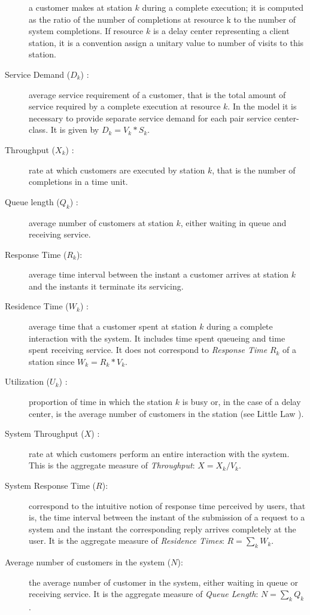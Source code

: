 \begin{description}
a customer makes at station $k$ during a complete execution; it is
computed as the ratio of the number of completions at resource k to
the number of system completions. If resource $k$ is a delay center
representing a client station, it is a convention assign a unitary
value to number of visits to this station.
\item[Service Demand ($D_k$) :] average service requirement of
a customer, that is the total amount of service required  by a
complete execution at resource $k$. In the model it is necessary to
provide separate service demand for each pair service center-class.
It is given by $D_k = V_k * S_k$.
\item[Throughput ($X_k$) :] rate at which customers are executed
by station $k$, that is the number of completions in a time unit.
\item[Queue length ($Q_k$) :] average number of customers at station
$k$, either waiting in queue and receiving service.
\item[Response Time ($R_k$):] average time interval between the instant
a customer arrives at station $k$ and the instants it terminate its
servicing.
\item[Residence Time ($W_k$) :] average
time that a customer spent at station $k$ during a complete
interaction with the system. It includes time spent queueing and
time spent receiving service. It does not correspond to
\emph{Response Time} $R_k$ of a station since $W_k = R_k * V_k$.
\item[Utilization ($U_k$) :] proportion of time in which the station $k$ is busy or, in the case
of a delay center, is the average  number of  customers in the
station (see Little Law \cite{Little}).
\item[System Throughput ($X$) :] rate at which customers perform
an entire interaction with the system. This is the aggregate measure
of \emph{Throughput}: $X = X_k / V_k$.
\item[System Response Time ($R$):] correspond to the intuitive
notion of response time perceived by users, that is, the time
interval between the instant of the submission of a request to a
system and the instant the corresponding reply arrives completely at
the user. It is the aggregate measure of \emph{Residence Times}: $R
= \sum_k W_k$.
\item[Average number of customers in the system ($N$):] the average
number of customer in the system, either waiting in queue or
receiving service. It is the aggregate measure of \emph{Queue
Length}: $N = \sum_k Q_k$.
\end{description}
